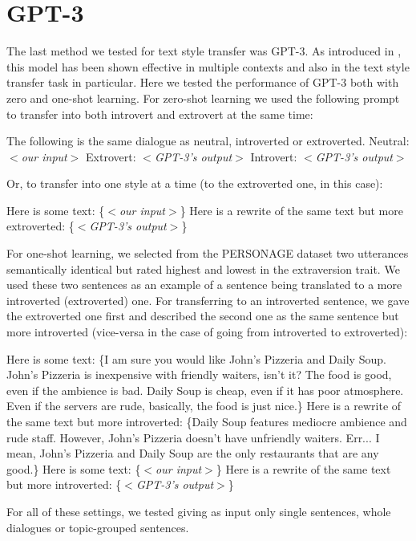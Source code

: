 \documentclass[nomenclature, english, biblatex]{kththesis}
\begin{document}
\section{GPT-3}
\label{sec:gpt3}
The last method we tested for text style transfer was GPT-3. As introduced in , this model has been shown effective in multiple contexts and also in the text style transfer task in particular. Here we tested the performance of GPT-3 both with zero and one-shot learning. For zero-shot learning we used the following prompt to transfer into both introvert and extrovert at the same time:
\begin{displayquote}
The following is the same dialogue as neutral, introverted or extroverted. Neutral: \textit{$<$our input$>$} Extrovert: \textit{$<$GPT-3's output$>$} Introvert: \textit{$<$GPT-3's output$>$}
\end{displayquote}
Or, to transfer into one style at a time (to the extroverted one, in this case):
\begin{displayquote} 
Here is some text: \{\textit{$<$our input$>$}\}
Here is a rewrite of the same text but more extroverted: \{\textit{$<$GPT-3's output$>$}\}
\end{displayquote}
For one-shot learning, we selected from the PERSONAGE dataset two utterances semantically identical but rated highest and lowest in the extraversion trait. We used these two sentences as an example of a sentence being translated to a more introverted (extroverted) one. For transferring to an introverted sentence, we gave the extroverted one first and described the second one as the same sentence but more introverted (vice-versa in the case of going from introverted to extroverted):
\begin{displayquote}
Here is some text: \{I am sure you would like John's Pizzeria and Daily Soup. John's Pizzeria is inexpensive with friendly waiters, isn't it? The food is good, even if the ambience is bad. Daily Soup is cheap, even if it has poor atmosphere. Even if the servers are rude, basically, the food is just nice.\} Here is a rewrite of the same text but more introverted: \{Daily Soup features mediocre ambience and rude staff. However, John's Pizzeria doesn't have unfriendly waiters. Err... I mean, John's Pizzeria and Daily Soup are the only restaurants that are any good.\} Here is some text: \{\textit{$<$our input$>$}\} Here is a rewrite of the same text but more introverted: \{\textit{$<$GPT-3's output$>$}\}
\end{displayquote}
For all of these settings, we tested giving as input only single sentences, whole dialogues or topic-grouped sentences.
\end{document}
